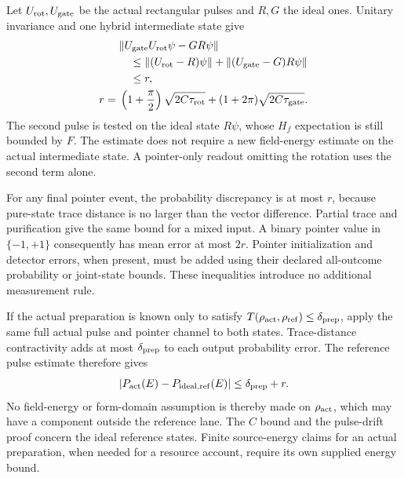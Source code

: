Let $U_{\rm rot},U_{\rm gate}$ be the actual rectangular pulses and
$R,G$ the ideal ones. Unitary invariance and one hybrid intermediate state
give
\begin{equation}
 \begin{aligned}
 &\|U_{\rm gate}U_{\rm rot}\psi-GR\psi\|\\
 &\quad\leq\|(U_{\rm rot}-R)\psi\|
                +\|(U_{\rm gate}-G)R\psi\|\\
 &\quad\leq r,\\
 r={}&\left(1+\frac\pi2\right)\sqrt{2C\tau_{\rm rot}}
       +(1+2\pi)\sqrt{2C\tau_{\rm gate}}.
 \end{aligned}
 \label{eq:chvisd-two-pulse-readout-error}
\end{equation}
The second pulse is tested on the ideal state $R\psi$, whose $H_f$
expectation is still bounded by $F$. The estimate does not require a new
field-energy estimate on the actual intermediate state. A pointer-only
readout omitting the rotation uses the second term alone.

For any final pointer event, the probability discrepancy is at most $r$,
because pure-state trace distance is no larger than the vector difference.
Partial trace and purification give the same bound for a mixed input.
A binary pointer value in $\{-1,+1\}$ consequently has mean error at
most $2r$. Pointer initialization and detector errors, when present,
must be added using their declared all-outcome probability or joint-state
bounds. These inequalities introduce no additional measurement rule.

If the actual preparation is known only to satisfy
$T(\rho_{\rm act},\rho_{\rm ref})\leq\delta_{\rm prep}$, apply the
same full actual pulse and pointer channel to both states. Trace-distance
contractivity adds at most $\delta_{\rm prep}$ to each output probability
error. The reference pulse estimate therefore gives
\begin{equation}
 |P_{\rm act}(E)-P_{\rm ideal,ref}(E)|
       \leq\delta_{\rm prep}+r.
 \label{eq:chvisd-readout-preparation-contraction}
\end{equation}
No field-energy or form-domain assumption is thereby made on
$\rho_{\rm act}$, which may have a component outside the reference lane.
The $C$ bound and the pulse-drift proof concern the ideal reference
states. Finite source-energy claims for an actual preparation, when
needed for a resource account, require its own supplied energy bound.

